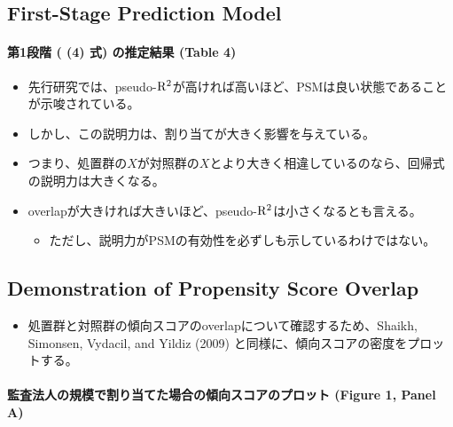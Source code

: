 \subsection*{First-Stage Prediction Model}

\paragraph{第1段階 ( (4) 式) の推定結果 (Table 4) }

\begin{itemize}
 \item 先行研究では、pseudo-${\rm R^2}$が高ければ高いほど、PSMは良い状態であることが示唆されている。
 \item しかし、この説明力は、割り当てが大きく影響を与えている。
 \item つまり、処置群の$X$が対照群の$X$とより大きく相違しているのなら、回帰式の説明力は大きくなる。
 \item overlapが大きければ大きいほど、pseudo-${\rm R^2}$は小さくなるとも言える。
  \begin{itemize}
   \item ただし、説明力がPSMの有効性を必ずしも示しているわけではない。
  \end{itemize}
\end{itemize}

\subsection*{Demonstration of Propensity Score Overlap}

\begin{itemize}
 \item 処置群と対照群の傾向スコアのoverlapについて確認するため、Shaikh, Simonsen, Vydacil, and Yildiz (2009) と同様に、傾向スコアの密度をプロットする。
\end{itemize}

\paragraph{監査法人の規模で割り当てた場合の傾向スコアのプロット (Figure 1, Panel A) }

